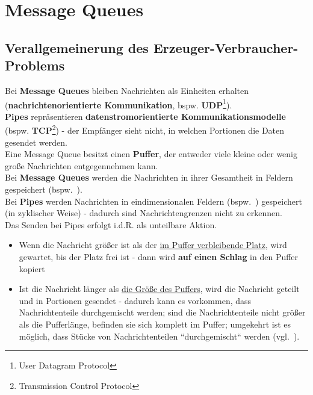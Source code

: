 \section{Message Queues}

\subsection{Verallgemeinerung des Erzeuger-Verbraucher-Problems}

Bei \textbf{Message Queues} bleiben Nachrichten als Einheiten erhalten (\textbf{nachrichtenorientierte Kommunikation}, bspw. \textbf{UDP}\footnote{User Datagram Protocol}).\\

\noindent
\textbf{Pipes} repräsentieren \textbf{datenstromorientierte Kommunikationsmodelle} (bspw. \textbf{TCP}\footnote{Transmission Control Protocol})  - der Empfänger sieht nicht, in welchen Portionen die Daten gesendet werden.\\

\noindent
Eine Message Queue besitzt einen \textbf{Puffer}, der entweder viele kleine oder wenig große Nachrichten entgegennehmen kann.\\

\noindent
Bei \textbf{Message Queues} werden die Nachrichten in ihrer Gesamtheit in Feldern gespeichert (bspw.~).\\

\noindent
Bei \textbf{Pipes} werden Nachrichten in eindimensionalen Feldern (bspw.~) gespeichert (in zyklischer Weise) - dadurch sind Nachrichtengrenzen nicht zu erkennen.\\

\noindent
Das Senden bei Pipes erfolgt i.d.R. als unteilbare Aktion.
\begin{itemize}
    \item Wenn die Nachricht größer ist als der \underline{im Puffer verbleibende Platz}, wird gewartet, bis der Platz frei ist - dann wird \textbf{auf einen Schlag} in den Puffer kopiert
    \item Ist die Nachricht länger als \underline{die Größe des Puffers}, wird die Nachricht geteilt und in Portionen gesendet - dadurch kann es vorkommen, dass Nachrichtenteile durchgemischt werden; sind die Nachrichtenteile nicht größer als die Pufferlänge, befinden sie sich komplett im Puffer;  umgekehrt ist es möglich, dass Stücke von Nachrichtenteilen ``durchgemischt`` werden (vgl.~\cite[117 f.]{Oec22}).
\end{itemize}

